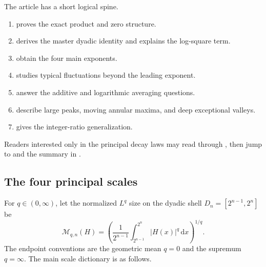 \documentclass[11pt,oneside]{article}
\numberwithin{equation}{section}
\theoremstyle{definition}
\theoremstyle{remark}
\newcommand{\dd}{\,\mathrm d}
\newcommand{\abs}[1]{\left|#1\right|}
\begin{document}
\begin{guidebox}
The article has a short logical spine.
\begin{enumerate}
\item {} proves the exact product and zero structure.
\item {} derives the master dyadic identity and explains the log-square term.
\item {} obtain the four main
      exponents.
\item {} studies typical fluctuations beyond the leading exponent.
\item {} answer the additive and
      logarithmic averaging questions.
\item {} describe large peaks, moving annular
      maxima, and deep exceptional valleys.
\item {} gives the integer-ratio generalization.
\end{enumerate}
Readers interested only in the principal decay laws may read through , then
jump to  and the summary in .
\end{guidebox}

\subsection{The four principal scales}

For \(q\in(0,\infty)\), let the normalized \(L^q\) size on the dyadic shell
\(D_n=[2^{n-1},2^n]\) be
\begin{equation}
 \mathcal M_{q,n}(H)
 =\left(\frac{1}{2^{n-1}}\int_{2^{n-1}}^{2^n}\abs{H(x)}^q\dd x\right)^{1/q}.
 \label{eq:shell-mean-intro}
\end{equation}
The endpoint conventions are the geometric mean \(q=0\) and the supremum \(q=\infty\).
The main scale dictionary is as follows.
\end{document}
